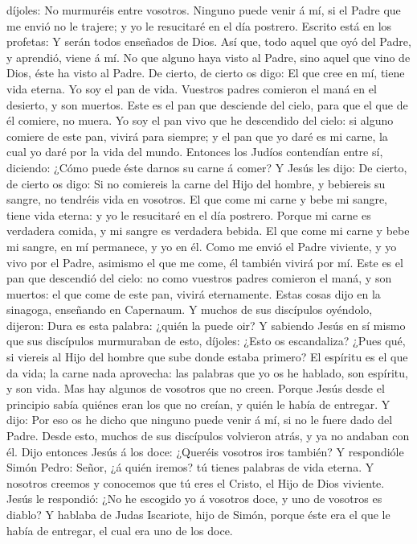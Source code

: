 díjoles: No murmuréis entre vosotros.  Ninguno puede venir
á mí, si el Padre que me envió no le trajere; y yo le resucitaré en el
día postrero.  Escrito está en los profetas: Y serán todos
enseñados de Dios. Así que, todo aquel que oyó del Padre, y aprendió,
viene á mí.  No que alguno haya visto al Padre, sino aquel
que vino de Dios, éste ha visto al Padre.  De cierto, de
cierto os digo: El que cree en mí, tiene vida eterna.  Yo
soy el pan de vida.  Vuestros padres comieron el maná en el
desierto, y son muertos.  Este es el pan que desciende del
cielo, para que el que de él comiere, no muera.  Yo soy el
pan vivo que he descendido del cielo: si alguno comiere de este pan,
vivirá para siempre; y el pan que yo daré es mi carne, la cual yo daré
por la vida del mundo.  Entonces los Judíos contendían
entre sí, diciendo: ¿Cómo puede éste darnos su carne á comer?
 Y Jesús les dijo: De cierto, de cierto os digo: Si no
comiereis la carne del Hijo del hombre, y bebiereis su sangre, no
tendréis vida en vosotros.  El que come mi carne y bebe mi
sangre, tiene vida eterna: y yo le resucitaré en el día postrero.
 Porque mi carne es verdadera comida, y mi sangre es
verdadera bebida.  El que come mi carne y bebe mi sangre,
en mí permanece, y yo en él.  Como me envió el Padre
viviente, y yo vivo por el Padre, asimismo el que me come, él también
vivirá por mí.  Este es el pan que descendió del cielo: no
como vuestros padres comieron el maná, y son muertos: el que come de
este pan, vivirá eternamente.  Estas cosas dijo en la
sinagoga, enseñando en Capernaum.  Y muchos de sus
discípulos oyéndolo, dijeron: Dura es esta palabra: ¿quién la puede oir?
 Y sabiendo Jesús en sí mismo que sus discípulos murmuraban
de esto, díjoles: ¿Esto os escandaliza?  ¿Pues qué, si
viereis al Hijo del hombre que sube donde estaba primero? 
El espíritu es el que da vida; la carne nada aprovecha: las palabras que
yo os he hablado, son espíritu, y son vida.  Mas hay
algunos de vosotros que no creen. Porque Jesús desde el principio sabía
quiénes eran los que no creían, y quién le había de entregar.
 Y dijo: Por eso os he dicho que ninguno puede venir á mí,
si no le fuere dado del Padre.  Desde esto, muchos de sus
discípulos volvieron atrás, y ya no andaban con él.  Dijo
entonces Jesús á los doce: ¿Queréis vosotros iros también? 
Y respondióle Simón Pedro: Señor, ¿á quién iremos? tú tienes palabras de
vida eterna.  Y nosotros creemos y conocemos que tú eres el
Cristo, el Hijo de Dios viviente.  Jesús le respondió: ¿No
he escogido yo á vosotros doce, y uno de vosotros es diablo?
 Y hablaba de Judas Iscariote, hijo de Simón, porque éste
era el que le había de entregar, el cual era uno de los doce.

